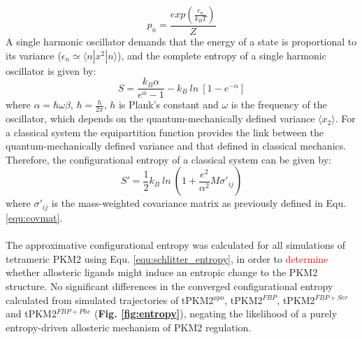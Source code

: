 %
%
\begin{equation}
p_{n} = \frac{exp \left( \frac{\epsilon_{n}}{k_{B}T} \right) }{Z}
\end{equation}
%
%
A single harmonic oscillator demands that the energy of a state is proportional to its variance ($\epsilon_{n} \simeq \langle n | x^2 | n \rangle$), and the complete entropy of a single harmonic oscillator is given by:
%
%
\begin{equation}
S = \frac{k_{B} \alpha}{e^{\alpha} - 1} - k_{B} \: ln \: [ 1 - e^{- \alpha}]
\end{equation}
%
%
where $\alpha = \hbar \omega \beta$, $\hbar = \frac{h}{2 \pi}$, $h$ is Plank's constant and $\omega$ is the frequency of the oscillator, which depends on the quantum-mechanically defined variance $\langle x_{2} \rangle$. For a classical system the equipartition function provides the link between the quantum-mechanically defined variance and that defined in classical mechanics. Therefore, the configurational entropy of a classical system can be given by:
%
%
\begin{equation}
S' = \frac{1}{2} k_{B} \: ln \: \left( 1 + \frac{e^{2}}{\alpha^{2}} M \sigma '_{ij} \right) 
\label{equ:schlitter_entropy}
\end{equation}
%
%
where $\sigma '_{ij}$ is the mass-weighted covariance matrix as previously defined in Equ. \ref{equ:covmat}.
%
%
\\\\
%
%
The approximative configurational entropy was calculated for all simulations of tetrameric PKM2 using Equ. \ref{equ:schlitter_entropy}, in order to \textcolor{red}{determine} whether allosteric ligands might induce an entropic change to the PKM2 structure. No significant differences in the converged configurational entropy calculated from simulated trajectories of tPKM2$^{apo}$, tPKM2$^{FBP}$, tPKM2$^{FBP+Ser}$ and tPKM2$^{FBP+Phe}$ (\textbf{Fig. \ref{fig:entropy}}), negating the likelihood of a purely entropy-driven allosteric mechanism of PKM2 regulation.
%
%
%
%
%
